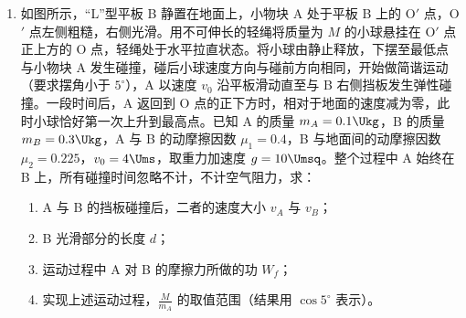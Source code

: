 \documentclass[\gkver]{gaokaozhenti}
\begin{document}
\begin{enumerate}
\item
如图所示，“L”型平板 B 静置在地面上，小物块 A 处于平板 B 上的 O$'$ 点，O$'$ 点左侧粗糙，右侧光滑。用不可伸长的轻绳将质量为 $M$ 的小球悬挂在 O$'$ 点正上方的 O 点，轻绳处于水平拉直状态。将小球由静止释放，下摆至最低点与小物块 A 发生碰撞，碰后小球速度方向与碰前方向相同，开始做简谐运动（要求摆角小于 $5^{\circ}$），A 以速度 $v_{0}$ 沿平板滑动直至与 B 右侧挡板发生弹性碰撞。一段时间后，A 返回到 O 点的正下方时，相对于地面的速度减为零，此时小球恰好第一次上升到最高点。已知 A 的质量 $m_{A} = 0.1 \Ukg$，B 的质量 $m_{B} = 0.3 \Ukg$，A 与 B 的动摩擦因数 $\mu_{1} = 0.4$，B 与地面间的动摩擦因数 $\mu_{2} = 0.225$，$v_{0} = 4 \Ums$，取重力加速度 $g = 10 \Umsq$。整个过程中 A 始终在 B 上，所有碰撞时间忽略不计，不计空气阻力，求：
\begin{enumerate}
	\item
	A 与 B 的挡板碰撞后，二者的速度大小 $v_{A}$ 与 $v_{B}$；
	\item
	B 光滑部分的长度 $d$；
	\item
	运动过程中 A 对 B 的摩擦力所做的功 $W_{f}$；
	\item
	实现上述运动过程，$\frac{M}{m_{A}}$ 的取值范围（结果用 $\cos5^{\circ}$ 表示）。
\end{enumerate}

\end{enumerate}
\end{document}
